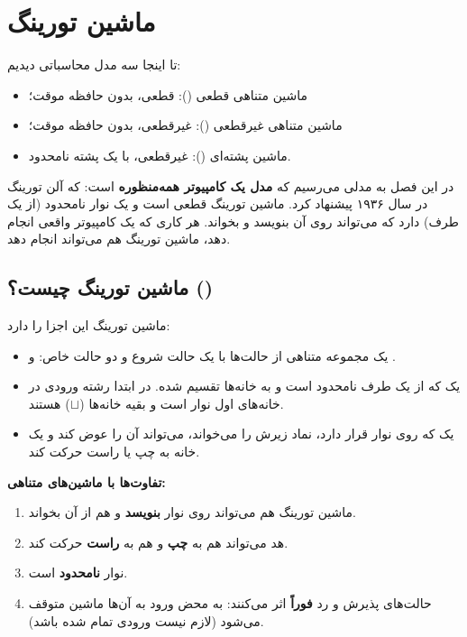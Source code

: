\chapter{ماشین تورینگ}

تا اینجا سه مدل محاسباتی دیدیم:
\begin{itemize}
\item ماشین متناهی قطعی (): قطعی، بدون حافظه موقت؛
\item ماشین متناهی غیرقطعی (): غیرقطعی، بدون حافظه موقت؛
\item ماشین پشته‌ای (): غیرقطعی، با یک پشته نامحدود.
\end{itemize}
در این فصل به مدلی می‌رسیم که \textbf{مدل یک کامپیوتر همه‌منظوره} است:  که آلن تورینگ در سال ۱۹۳۶ پیشنهاد کرد. ماشین تورینگ قطعی است و یک نوار نامحدود (از یک طرف) دارد که می‌تواند روی آن بنویسد و بخواند. هر کاری که یک کامپیوتر واقعی انجام دهد، ماشین تورینگ هم می‌تواند انجام دهد.

\section{ماشین تورینگ چیست؟ ()}

ماشین تورینگ این اجزا را دارد:
\begin{itemize}
\item یک مجموعه متناهی از حالت‌ها با یک حالت شروع و دو حالت خاص:  و .
\item یک  که از یک طرف نامحدود است و به خانه‌ها تقسیم شده. در ابتدا رشته ورودی در خانه‌های اول نوار است و بقیه خانه‌ها  ($\sqcup$) هستند.
\item یک  که روی نوار قرار دارد، نماد زیرش را می‌خواند، می‌تواند آن را عوض کند و یک خانه به چپ یا راست حرکت کند.
\end{itemize}
\begin{ltrfig}
\end{ltrfig}

\textbf{تفاوت‌ها با ماشین‌های متناهی:}
\begin{enumerate}
\item ماشین تورینگ هم می‌تواند روی نوار \textbf{بنویسد} و هم از آن بخواند.
\item هد می‌تواند هم به \textbf{چپ} و هم به \textbf{راست} حرکت کند.
\item نوار \textbf{نامحدود} است.
\item حالت‌های پذیرش و رد \textbf{فوراً} اثر می‌کنند: به محض ورود به آن‌ها ماشین متوقف می‌شود (لازم نیست ورودی تمام شده باشد).
\end{enumerate}

